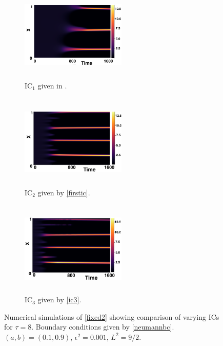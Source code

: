 \begin{figure}[H]
    \centering
    \begin{subfigure}[b]{0.32\textwidth}
        \centering
        \includegraphics[width=5cm,height=4.5cm]{gaff8.png}
        \caption{$\text{IC}_1$ given in \cite{gaffmonk}.}
        \label{}
    \end{subfigure}
    \hfill
    \begin{subfigure}[b]{0.32\textwidth}
        \centering
        \includegraphics[width=5cm,height=4.5cm]{ic28.png}
        \caption{$\text{IC}_2$ given by \eqref{firstic}.}
        \label{}
    \end{subfigure}
    \hfill
    \begin{subfigure}[b]{0.32\textwidth}
        \centering
        \includegraphics[width=5cm,height=4.5cm]{ic38.png}
        \caption{$\text{IC}_3$ given by \eqref{ic3}.}
        \label{}
    \end{subfigure}
    \caption{Numerical simulations of \eqref{fixed2} showing comparison of varying ICs for $\tau=8$. Boundary conditions given by \eqref{neumannbc}. $(a,b)=(0.1,0.9)$, $\epsilon^2=0.001$, $L^2=9/2$.}
    \label{fig:figtau8}
\end{figure}

